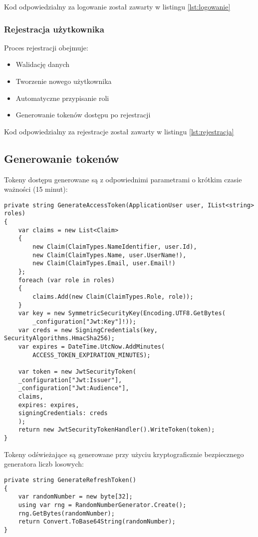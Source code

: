 Kod odpowiedzialny za logowanie został zawarty w listingu \ref{lst:logowanie}


\subsubsection{Rejestracja użytkownika}
Proces rejestracji obejmuje:
\begin{itemize}
	\item Walidację danych
	\item Tworzenie nowego użytkownika
	\item Automatyczne przypisanie roli
	\item Generowanie tokenów dostępu po rejestracji
\end{itemize}

Kod odpowiedzialny za rejestracje został zawarty w listingu \ref{lst:rejestracja}

\subsection{Generowanie tokenów}
Tokeny dostępu generowane są z odpowiednimi parametrami o krótkim czasie ważności (15 minut):

\begin{lstlisting}[style=csharp, caption={Generowanie tokenu JWT}]
private string GenerateAccessToken(ApplicationUser user, IList<string> roles)
{
	var claims = new List<Claim>
	{
		new Claim(ClaimTypes.NameIdentifier, user.Id),
		new Claim(ClaimTypes.Name, user.UserName!),
		new Claim(ClaimTypes.Email, user.Email!)
	};
	foreach (var role in roles)
	{
		claims.Add(new Claim(ClaimTypes.Role, role));
	}
	var key = new SymmetricSecurityKey(Encoding.UTF8.GetBytes(
		_configuration["Jwt:Key"]!));
	var creds = new SigningCredentials(key, SecurityAlgorithms.HmacSha256);
	var expires = DateTime.UtcNow.AddMinutes(
		ACCESS_TOKEN_EXPIRATION_MINUTES);
	
	var token = new JwtSecurityToken(
	_configuration["Jwt:Issuer"],
	_configuration["Jwt:Audience"],
	claims,
	expires: expires,
	signingCredentials: creds
	);
	return new JwtSecurityTokenHandler().WriteToken(token);
}
\end{lstlisting}

Tokeny odświeżające są generowane przy użyciu kryptograficznie bezpiecznego generatora liczb losowych:

\begin{lstlisting}[style=csharp, caption={Generowanie tokenu odświeżającego}]
private string GenerateRefreshToken()
{
	var randomNumber = new byte[32];
	using var rng = RandomNumberGenerator.Create();
	rng.GetBytes(randomNumber);
	return Convert.ToBase64String(randomNumber);
}
\end{lstlisting}

